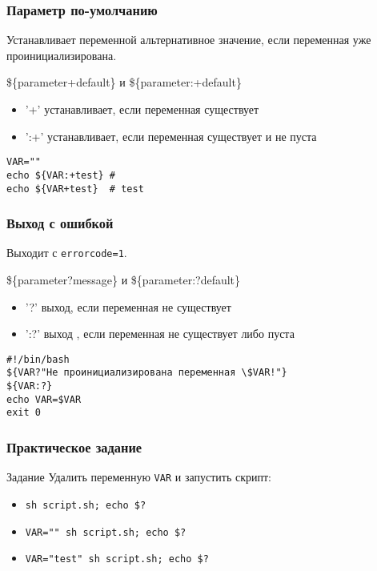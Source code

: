 \begin{frame}[fragile]
	\frametitle{Параметр по-умолчанию}

	Устанавливает переменной альтернативное значение, если переменная уже проинициализирована.

	\begin{block}{\$\{parameter+default\} и \$\{parameter:+default\}}
	\begin{itemize}
		\item '+' устанавливает, если переменная существует
		\item ':+' устанавливает, если переменная существует и не пуста
	\end{itemize}
	\begin{lstlisting}
VAR=""
echo ${VAR:+test} # 
echo ${VAR+test}  # test
\end{lstlisting}
	\end{block}

\end{frame}


\begin{frame}[fragile]
	\frametitle{Выход с ошибкой}

	Выходит с {\tt errorcode=1}.

	\begin{block}{\$\{parameter?message\} и \$\{parameter:?default\}}
	\begin{itemize}
		\item '?' выход, если переменная не существует
		\item ':?' выход , если переменная не существует либо пуста
	\end{itemize}

	\begin{lstlisting}
#!/bin/bash
${VAR?"Не проинициализирована переменная \$VAR!"}
${VAR:?}
echo VAR=$VAR
exit 0
	\end{lstlisting}
	\end{block}
\end{frame}

\begin{frame}[fragile]
	\frametitle{Практическое задание}

	\begin{block}{Задание}
		Удалить переменную {\tt VAR} и запустить скрипт:
		\begin{itemize}
			\item {\tt sh script.sh; echo \$?}
			\item {\tt VAR="" sh script.sh; echo \$?}
			\item {\tt VAR="test" sh script.sh; echo \$?}
		\end{itemize}
	\end{block}
\end{frame}

